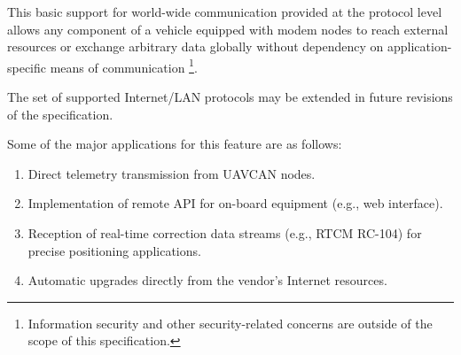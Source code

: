 This basic support for world-wide communication provided at the protocol level allows any component
of a vehicle equipped with modem nodes to reach external resources or exchange arbitrary data globally
without dependency on application-specific means of communication%
\footnote{Information security and other security-related concerns are outside of the scope of this specification.}.

The set of supported Internet/LAN protocols may be extended in future revisions of the specification.

Some of the major applications for this feature are as follows:

\begin{enumerate}
    \item Direct telemetry transmission from UAVCAN nodes.
    \item Implementation of remote API for on-board equipment (e.g., web interface).
    \item Reception of real-time correction data streams (e.g., RTCM RC-104) for precise positioning applications.
    \item Automatic upgrades directly from the vendor's Internet resources.
\end{enumerate}

